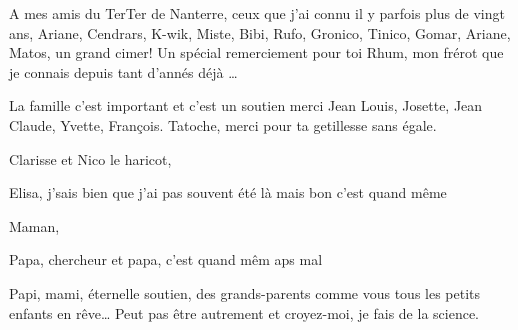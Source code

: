 A mes amis du TerTer de Nanterre, ceux que j'ai connu il y parfois plus
de vingt ans, Ariane, Cendrars, K-wik, Miste, Bibi, Rufo, Gronico,
Tinico, Gomar, Ariane, Matos, un grand cimer! Un spécial remerciement
pour toi Rhum, mon frérot que je connais depuis tant d'annés déjà
\ldots{}

La famille c'est important et c'est un soutien merci Jean Louis,
Josette, Jean Claude, Yvette, François. Tatoche, merci pour ta
getillesse sans égale.

Clarisse et Nico le haricot,

Elisa, j'sais bien que j'ai pas souvent été là mais bon c'est quand même

Maman,

Papa, chercheur et papa, c'est quand mêm aps mal

Papi, mami, éternelle soutien, des grands-parents comme vous tous les
petits enfants en rêve\ldots{} Peut pas être autrement et croyez-moi, je
fais de la science.
